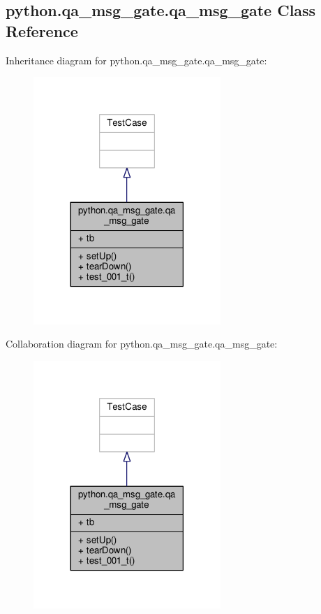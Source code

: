 \subsection{python.\+qa\+\_\+msg\+\_\+gate.\+qa\+\_\+msg\+\_\+gate Class Reference}
\label{classpython_1_1qa__msg__gate_1_1qa__msg__gate}


Inheritance diagram for python.\+qa\+\_\+msg\+\_\+gate.\+qa\+\_\+msg\+\_\+gate\+:
\nopagebreak
\begin{figure}[H]
\begin{center}
\leavevmode
\includegraphics[width=201pt]{d2/d31/classpython_1_1qa__msg__gate_1_1qa__msg__gate__inherit__graph}
\end{center}
\end{figure}


Collaboration diagram for python.\+qa\+\_\+msg\+\_\+gate.\+qa\+\_\+msg\+\_\+gate\+:
\nopagebreak
\begin{figure}[H]
\begin{center}
\leavevmode
\includegraphics[width=201pt]{dd/d80/classpython_1_1qa__msg__gate_1_1qa__msg__gate__coll__graph}
\end{center}
\end{figure}
